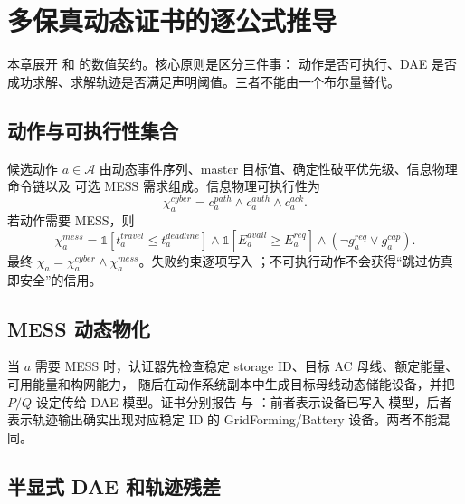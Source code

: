 \section{多保真动态证书的逐公式推导}\label{sec:res-dynamic-derivation}

本章展开  和
 的数值契约。核心原则是区分三件事：
动作是否可执行、DAE 是否成功求解、求解轨迹是否满足声明阈值。三者不能由一个布尔量替代。

\subsection{动作与可执行性集合}

候选动作 $a\in\mathcal A$ 由动态事件序列、master 目标值、确定性破平优先级、信息物理命令链以及
可选 MESS 需求组成。信息物理可执行性为
\begin{equation}
 \chi_a^{cyber}=c_a^{path}\land c_a^{auth}\land c_a^{ack}.
\end{equation}
若动作需要 MESS，则
\begin{equation}
 \chi_a^{mess}=
 \mathbb 1[t_a^{travel}\le t_a^{deadline}]
 \land\mathbb 1[E_a^{avail}\ge E_a^{req}]
 \land\left(\neg g_a^{req}\lor g_a^{cap}\right).
\end{equation}
最终 $\chi_a=\chi_a^{cyber}\land\chi_a^{mess}$。失败约束逐项写入
；不可执行动作不会获得“跳过仿真即安全”的信用。

\subsection{MESS 动态物化}

当 $a$ 需要 MESS 时，认证器先检查稳定 storage ID、目标 AC 母线、额定能量、可用能量和构网能力，
随后在动作系统副本中生成目标母线动态储能设备，并把 $P/Q$ 设定传给 DAE 模型。证书分别报告
 与 ：前者表示设备已写入
模型，后者表示轨迹输出确实出现对应稳定 ID 的 GridForming/Battery 设备。两者不能混同。

\subsection{半显式 DAE 和轨迹残差}

